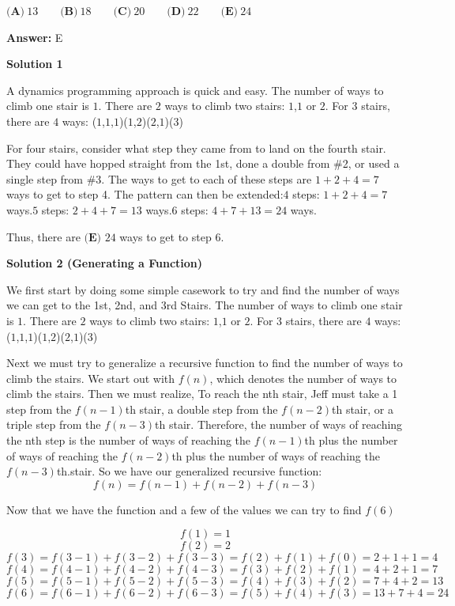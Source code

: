 \begin{enumerate}
 $\textbf{(A)}\ 13 \qquad\textbf{(B)}\ 18\qquad\textbf{(C)}\ 20\qquad\textbf{(D)}\ 22\qquad\textbf{(E)}\ 24$

 \textbf{Answer: }E



\textbf{Solution 1}

A dynamics programming approach is quick and easy. The number of ways to climb one stair is $1$. There are $2$ ways to climb two stairs: $1$,$1$ or $2$. For 3 stairs, there are $4$ ways: ($1$,$1$,$1$)($1$,$2$)($2$,$1$)($3$)

 For four stairs, consider what step they came from to land on the fourth stair. They could have hopped straight from the 1st, done a double from \#2, or used a single step from \#3. The ways to get to each of these steps are $1+2+4=7$ ways to get to step 4. The pattern can then be extended:$4$ steps: $1+2+4=7$ ways.$5$ steps: $2+4+7=13$ ways.$6$ steps: $4+7+13=24$ ways.

 Thus, there are $\boxed{\textbf{(E) } 24}$ ways to get to step $6.$




\textbf{Solution 2 (Generating a Function)}

We first start by doing some simple casework to try and find the number of ways we can get to the 1st, 2nd, and 3rd Stairs. The number of ways to climb one stair is $1$. There are $2$ ways to climb two stairs: $1$,$1$ or $2$. For 3 stairs, there are $4$ ways: ($1$,$1$,$1$)($1$,$2$)($2$,$1$)($3$)

 Next we must try to generalize a recursive function to find the number of ways to climb the stairs. We start out with $f(n)$, which denotes the number of ways to climb the stairs. Then we must realize, To reach the nth stair, Jeff must take a 1 step from the $f(n-1)$th stair, a double step from the $f(n-2)$th stair, or a triple step from the $f(n-3)$th stair. Therefore, the number of ways of reaching the nth step is the number of ways of reaching the $f(n-1)$th plus the number of ways of reaching the $f(n-2)$th plus the number of ways of reaching the $f(n-3)$th.stair. So we have our generalized recursive function: 
 \[f(n)=f(n-1)+f(n-2)+f(n-3)\]

 Now that we have the function and a few of the values we can try to find $f(6)$

 \[f(1)=1\]
 \[f(2)=2\]
 \[f(3)=f(3-1)+f(3-2)+f(3-3)=f(2)+f(1)+f(0)=2+1+1=4\]
 \[f(4)=f(4-1)+f(4-2)+f(4-3)=f(3)+f(2)+f(1)=4+2+1=7\]
 \[f(5)=f(5-1)+f(5-2)+f(5-3)=f(4)+f(3)+f(2)=7+4+2=13\]
 \[f(6)=f(6-1)+f(6-2)+f(6-3)=f(5)+f(4)+f(3)=13+7+4=24\]


\end{enumerate}
